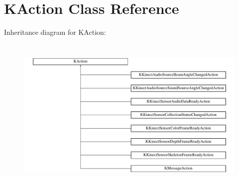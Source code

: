 \hypertarget{class_k_action}{\section{\-K\-Action \-Class \-Reference}
\label{class_k_action}
}
\-Inheritance diagram for \-K\-Action\-:\begin{figure}[H]
\begin{center}
\leavevmode
\includegraphics[height=7.544909cm]{class_k_action}
\end{center}
\end{figure}

